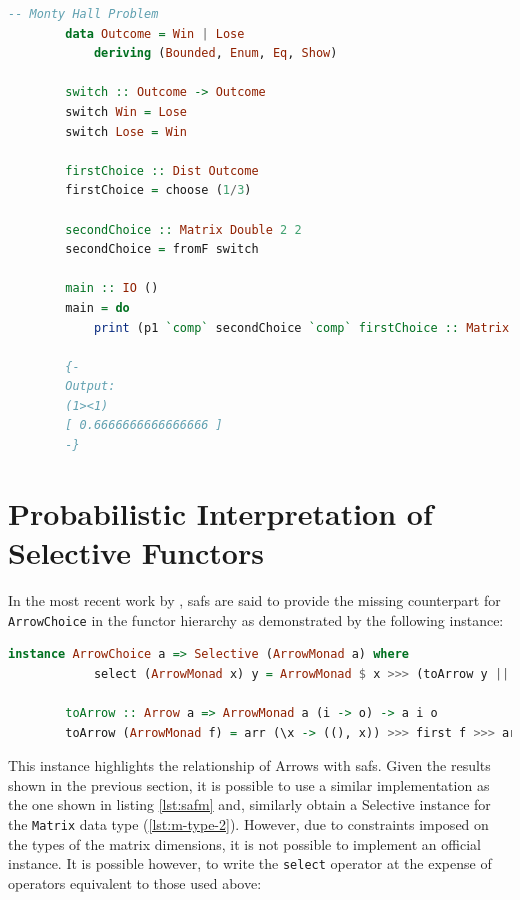 \documentclass[
  oneside,
  11pt, a4paper,
  footinclude=true,
  headinclude=true,
  cleardoublepage=empty
]{scrbook}
\theoremstyle{definition}
\theoremstyle{definition}
\begin{document}
        \begin{lstlisting}[language=Haskell, caption={LAoP Monty Hall Problem},captionpos=b]
        -- Monty Hall Problem
        data Outcome = Win | Lose
            deriving (Bounded, Enum, Eq, Show)
        
        switch :: Outcome -> Outcome
        switch Win = Lose
        switch Lose = Win
        
        firstChoice :: Dist Outcome
        firstChoice = choose (1/3)
        
        secondChoice :: Matrix Double 2 2
        secondChoice = fromF switch 
    
        main :: IO ()
        main = do 
            print (p1 `comp` secondChoice `comp` firstChoice :: Matrix Double 1 1)
            
        {- 
        Output:
        (1><1)
        [ 0.6666666666666666 ]
        -}
        \end{lstlisting}{}
        
    \section{Probabilistic Interpretation of Selective Functors}
        
        In the most recent work by \cite{andrey2019selective}, \glspl{saf} are said to provide the missing counterpart for \texttt{ArrowChoice} in the functor hierarchy as demonstrated by the following instance:
        
        \begin{lstlisting}[language=Haskell, label={lst:safm}, caption={Selective ArrowMonad instance},captionpos=b]
        instance ArrowChoice a => Selective (ArrowMonad a) where
            select (ArrowMonad x) y = ArrowMonad $ x >>> (toArrow y ||| returnA)
            
        toArrow :: Arrow a => ArrowMonad a (i -> o) -> a i o
        toArrow (ArrowMonad f) = arr (\x -> ((), x)) >>> first f >>> arr (uncurry ($))
        \end{lstlisting}{}
	    
	    This instance highlights the relationship of Arrows with \glspl{saf}. Given the results shown in the previous section, it is possible to use a similar implementation as the one shown in listing \ref{lst:safm} and, similarly obtain a Selective instance for the \texttt{Matrix} data type (\ref{lst:m-type-2}). However, due to constraints imposed on the types of the matrix dimensions, it is not possible to implement an official instance. It is possible however, to write the \texttt{select} operator at the expense of operators equivalent to those used above:
	    
\end{document}
